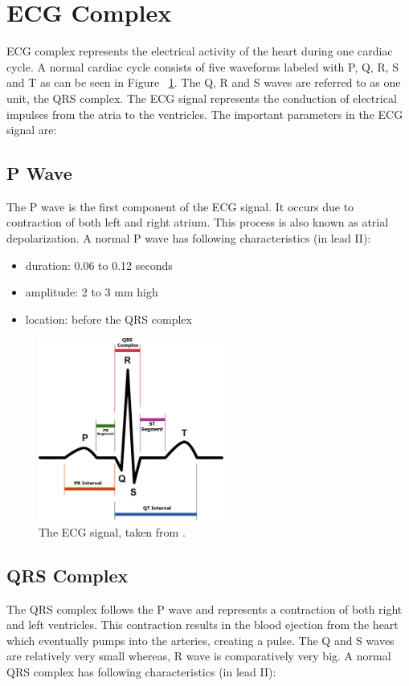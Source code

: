 \section{ECG Complex}


ECG complex represents the electrical activity of the heart during one cardiac cycle. A normal cardiac cycle consists of five waveforms labeled with P, Q, R, S and T as can be seen in Figure ~\ref{fig:SinusRhythmLabels}. The Q, R and S waves are referred to as one unit, the QRS complex. The ECG signal represents the conduction of electrical impulses from the atria to the ventricles. The important parameters in the ECG signal are:

\subsection{P Wave}

The P wave is the first component of the ECG signal. It occurs due to contraction of both left and right atrium. This process is also known as atrial depolarization. A normal P wave has following characteristics (in lead II):
\begin{itemize}
	\item duration: 0.06 to 0.12 seconds
	\item amplitude: 2 to 3 mm high
	\item location: before the QRS complex
\end{itemize}

\begin{figure}[htpb]
	\centering
	\includegraphics[width=\textwidth,height=6cm,keepaspectratio=true]{images/SinusRhythmLabels}
	\caption{
		The ECG signal, taken from \cite{wiki:SinusRhythmLabels}.
	}
	\label{fig:SinusRhythmLabels}
\end{figure}

\subsection{QRS Complex}
The QRS complex follows the P wave and represents a contraction of both right and left ventricles. This contraction results in the blood ejection from the heart which eventually pumps into the arteries, creating a pulse. The Q and S waves are relatively very small whereas, R wave is comparatively very big. A normal QRS complex has following characteristics (in lead II):

